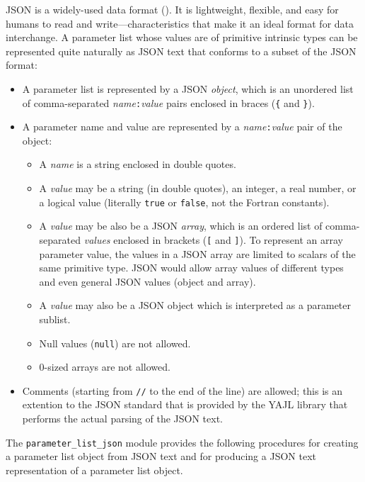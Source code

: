 \documentclass[11pt]{article}
\begin{document}
JSON is a widely-used data format ().  It is
lightweight, flexible, and easy for humans to read and write---characteristics
that make it an ideal format for data interchange.  A parameter list whose
values are of primitive intrinsic types can be represented quite naturally
as JSON text that conforms to a subset of the JSON format:
\begin{itemize}\setlength{\itemsep}{0pt}
\item
  A parameter list is represented by a JSON \emph{object}, which is an
  unordered list of comma-separated \emph{name}\texttt{:}\emph{value}
  pairs enclosed in braces (\texttt{\{} and \texttt{\}}).
\item
  A parameter name and value are represented by a
  \emph{name}\texttt{:}\emph{value} pair of the object:
  \begin{itemize}\setlength{\itemsep}{0pt}
  \item
    A \emph{name} is a string enclosed in double quotes.
  \item
    A \emph{value} may be a string (in double quotes), an integer, a real
    number, or a logical value (literally \texttt{true} or \texttt{false},
    not the Fortran constants).
  \item
    A \emph{value} may be also be a JSON \emph{array}, which is an ordered
    list of comma-separated \emph{values} enclosed in brackets (\texttt{[}
    and \texttt{]}).  To represent an array parameter value, the values in
    a JSON array are limited to scalars of the same primitive type.
    JSON would allow array values of
    different types and even general JSON values (object and array).
  \item
    A \emph{value} may also be a JSON object which is interpreted as a
    parameter sublist.
  \item
    Null values (\texttt{null}) are not allowed.
  \item
    0-sized arrays are not allowed.
  \end{itemize}
\item
  Comments (starting from \texttt{//} to the end of the line) are allowed;
  this is an extention to the JSON standard that is provided by the YAJL
  library that performs the actual parsing of the JSON text.
\end{itemize}

The \texttt{parameter_list_json} module provides the following procedures
for creating a parameter list object from JSON text and for producing a JSON
text representation of a parameter list object.
\end{document}
